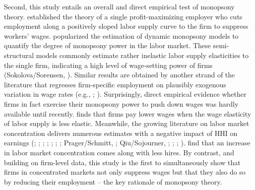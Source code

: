 \documentclass[11pt,oneside,reqno,xcolor=dvipsnames]{article} %
\begin{document}
Second, this study entails an overall and direct empirical test of monopsony theory. \citet{Robinson1933} established the theory of a single profit-maximizing employer who cuts employment along a positively sloped labor supply curve to the firm to suppress workers' wages. \citet{Manning2003a} popularized the estimation of dynamic monopsony models to quantify the degree of monopsony power in the labor market. These semi-structural models commonly estimate rather inelastic labor supply elasticities to the single firm, indicating a high level of wage-setting power of firms (Sokolova/Sorensen, \citeyear{SokolovaSorensen2021}). Similar results are obtained by another strand of the literature that regresses firm-specific employment on plausibly exogenous variation in wage rates (e.g., \citealp{Falch2010}; \citealp{StaigerEtAl2010}). Surprisingly, direct empirical evidence whether firms in fact exercise their monopsony power to push down wages was hardly available until recently. \citet{Webber2015} finds that firms pay lower wages when the wage elasticity of labor supply is less elastic. Meanwhile, the growing literature on labor market concentration delivers numerous estimates with a negative impact of HHI on earnings (\citealp{AbelEtAl2018}; \citealp{AzarEtAl2017}; \citealp{BassaniniEtAl2019}; \citealp{BenmelechEtAl2020}; \citealp{DodiniEtAl2020}; \citealp{Lipsius2018}; \citealp{Martins2018}; Prager/Schmitt, \citeyear{PragerSchmitt2021}; Qiu/Sojourner, \citeyear{QiuSojourner2019}; \citealp{Rinz2020}; \citealp{SchubertEtAl2020}; \citealp{Thoresson2021}). \citet{MarinescuEtAl2021} find that an increase in labor market concentration comes along with less hires. By contrast, and building on firm-level data, this study is the first to simultaneously show that firms in concentrated markets not only suppress wages but that they also do so by reducing their employment -- the key rationale of monopsony theory.
\end{document}

